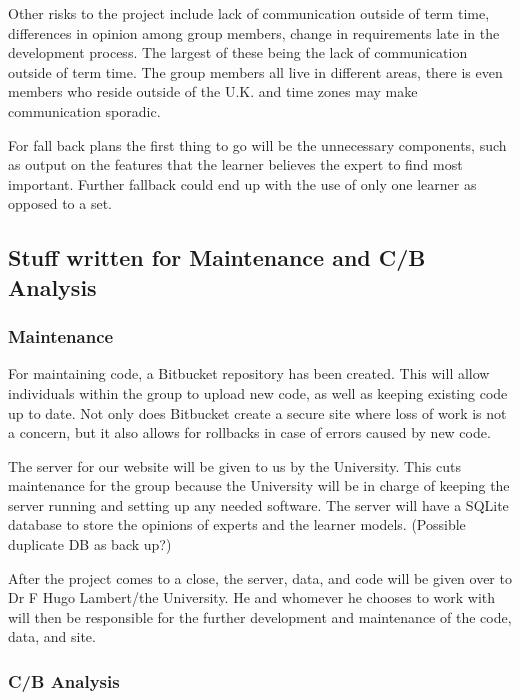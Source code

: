 \documentclass[11pt]{article} %
\numberwithin{equation}{section}
\begin{document}
\begin{itemize}
\quad Other risks to the project include lack of communication outside of term time, differences in opinion among group members, change in requirements late in the development process. The largest of these being the lack of communication outside of term time. The group members all live in different areas, there is even members who reside outside of the U.K. and time zones may make communication sporadic. \par

\quad For fall back plans the first thing to go will be the unnecessary components, such as output on the features that the learner believes the expert to find most important. Further fallback could end up with the use of only one learner as opposed to a set.\par

\subsection{Stuff written for Maintenance and C/B Analysis}

\subsubsection{Maintenance}
\quad For maintaining code, a Bitbucket repository has been created. This will allow individuals within the group to upload new code, as well as keeping existing code up to date.  Not only does Bitbucket create a secure site where loss of work is not a concern, but it also allows for rollbacks in case of errors caused by new code.\par

\quad The server for our website will be given to us by the University. This cuts maintenance for the group because the University will be in charge of keeping the server running and setting up any needed software. The server will have a SQLite database to store the opinions of experts and the learner models. (Possible duplicate DB as back up?)\par

\quad After the project comes to a close, the server, data, and code will be given over to Dr F Hugo Lambert/the University. He and whomever he chooses to work with will then be responsible for the further development and maintenance of the code, data, and site.\par


\subsubsection{C/B Analysis}


\end{itemize}
\end{document}
